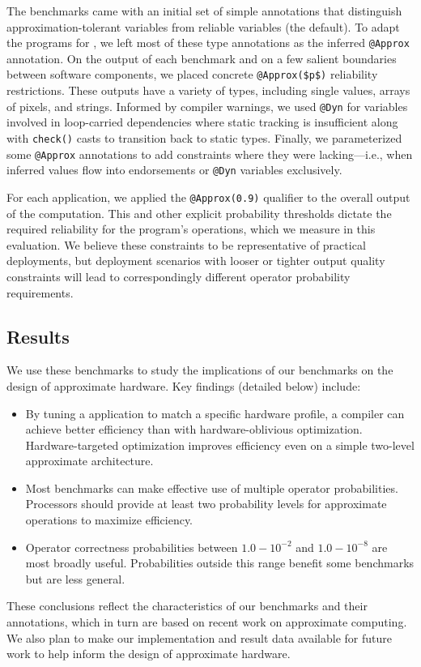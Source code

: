 \documentclass[10pt,nocopyrightspace,preprint]{sigplanconf}
\newcommand{\code}{\lstinline[emphstyle={},keywordstyle={}]}
\begin{document}
The benchmarks came with an initial set of simple annotations that distinguish
approximation-tolerant variables from reliable variables (the default).
To adapt the programs for \lang, we left most of these type annotations as the
inferred \code{@Approx} annotation.
On the output of each benchmark and on a few salient boundaries between software components, we placed concrete
\code{@Approx($p$)} reliability restrictions.
These outputs have a variety of types, including single values, arrays of
pixels, and strings.
Informed by compiler warnings, we used \code{@Dyn} for variables
involved in loop-carried dependencies where static tracking is insufficient
along with \code{check()} casts to transition back to static types.
Finally, we parameterized some \code{@Approx} annotations to add constraints
where they were lacking---i.e., when inferred values flow into endorsements or
\code{@Dyn} variables exclusively.

For each application, we applied the \code{@Approx(0.9)} qualifier to the
overall output of the computation.
This and other explicit probability thresholds dictate the required reliability
for the program's operations, which we measure in this evaluation.
We believe these constraints to be representative of practical deployments,
but
deployment scenarios with looser or tighter output quality constraints will
lead to correspondingly different operator probability requirements.

\subsection{Results}

We use these benchmarks to study the implications of our benchmarks on the
design of approximate hardware.
Key findings (detailed below) include:
%
\begin{itemize}
\item By tuning a application to match a specific hardware profile, a compiler
    can achieve better efficiency than with hardware-oblivious optimization.
    Hardware-targeted optimization improves efficiency
    even on a simple two-level approximate architecture.
\item Most benchmarks can make effective use of multiple operator
    probabilities. Processors should provide at least two probability levels
    for approximate operations to maximize efficiency.
\item Operator correctness probabilities between $1.0 - 10^{-2}$ and $1.0 -
    10^{-8}$ are most broadly useful. Probabilities outside this range benefit
    some benchmarks but are less general.
\end{itemize}
%
These conclusions reflect the characteristics of our benchmarks and their
annotations, which in turn are based on recent work on approximate computing.
We also plan to make our implementation and result data available for future work to help
inform
the design of approximate hardware.
\end{document}
